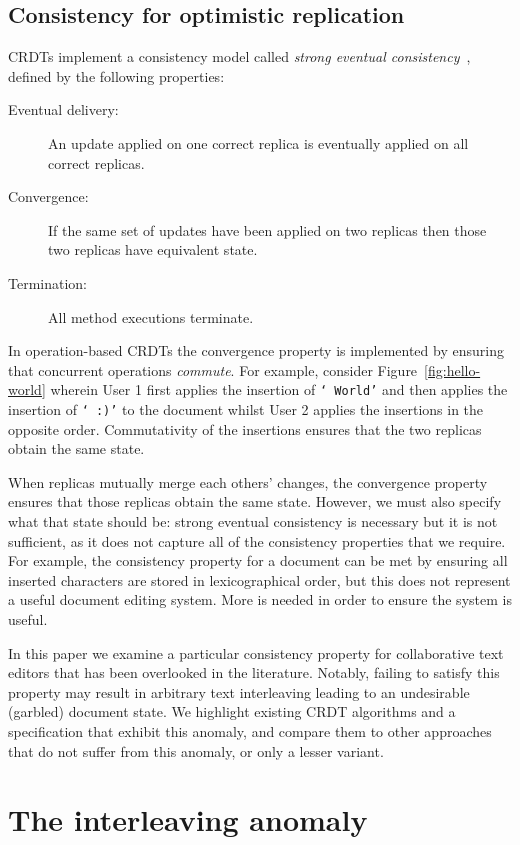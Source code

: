 \documentclass[sigconf]{acmart}
\begin{document}
\subsection{Consistency for optimistic replication}

CRDTs implement a consistency model called \emph{strong eventual consistency}~\cite{Shapiro:2011un,Gomes:2017gy}, defined by the following properties:
\begin{description}
\item[Eventual delivery:] An update applied on one correct replica is eventually applied on all correct replicas.
\item[Convergence:] If the same set of updates have been applied on two replicas then those two replicas have equivalent state.
\item[Termination:] All method executions terminate.
\end{description}
In operation-based CRDTs the convergence property is implemented by ensuring that concurrent operations \emph{commute}.
For example, consider Figure~\ref{fig:hello-world} wherein User 1 first applies the insertion of \texttt{` World'} and then applies the insertion of \texttt{` :)'} to the document whilst User 2 applies the insertions in the opposite order.
Commutativity of the insertions ensures that the two replicas obtain the same state.

When replicas mutually merge each others' changes, the convergence property ensures that those replicas obtain the same state.
However, we must also specify what that state should be: strong eventual consistency is necessary but it is not sufficient, as it does not capture all of the consistency properties that we require.
For example, the consistency property for a document can be met by ensuring all inserted characters are stored in lexicographical order, but this does not represent a useful document editing system. More is needed in order to ensure the system is useful.

In this paper we examine a particular consistency property for collaborative text editors that has been overlooked in the literature.
Notably, failing to satisfy this property may result in arbitrary text interleaving leading to an undesirable (garbled) document state.
We highlight existing CRDT algorithms and a specification that exhibit this anomaly, and compare them to other approaches that do not suffer from this anomaly, or only a lesser variant.

\section{The interleaving anomaly}\label{sec:anomaly}
\end{document}
